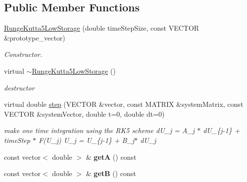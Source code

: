\subsection*{Public Member Functions}
\begin{DoxyCompactItemize}
\item 
\hyperlink{classnatrium_1_1RungeKutta5LowStorage_a1f879ee900db9ac82ddd12820e7b703d}{RungeKutta5LowStorage} (double timeStepSize, const VECTOR \&prototype\_\-vector)
\begin{DoxyCompactList}\small\item\em Constructor. \item\end{DoxyCompactList}\item 
\hypertarget{classnatrium_1_1RungeKutta5LowStorage_a915493da30cf9308bd47e87d0c20cad8}{
virtual \hyperlink{classnatrium_1_1RungeKutta5LowStorage_a915493da30cf9308bd47e87d0c20cad8}{$\sim$RungeKutta5LowStorage} ()}
\label{classnatrium_1_1RungeKutta5LowStorage_a915493da30cf9308bd47e87d0c20cad8}

\begin{DoxyCompactList}\small\item\em destructor \item\end{DoxyCompactList}\item 
\hypertarget{classnatrium_1_1RungeKutta5LowStorage_a11ed7e7ef3b4a5e575452261bc783a21}{
virtual double \hyperlink{classnatrium_1_1RungeKutta5LowStorage_a11ed7e7ef3b4a5e575452261bc783a21}{step} (VECTOR \&vector, const MATRIX \&systemMatrix, const VECTOR \&systemVector, double t=0, double dt=0)}
\label{classnatrium_1_1RungeKutta5LowStorage_a11ed7e7ef3b4a5e575452261bc783a21}

\begin{DoxyCompactList}\small\item\em make one time integration using the RK5 scheme dU\_\-j = A\_\-j $\ast$ dU\_\-\{j-\/1\} + timeStep $\ast$ F(U\_\-j) U\_\-j = U\_\-\{j-\/1\} + B\_\-j$\ast$ dU\_\-j \item\end{DoxyCompactList}\item 
\hypertarget{classnatrium_1_1RungeKutta5LowStorage_a452fad5bef3b7734c94ca5796ce0c589}{
const vector$<$ double $>$ \& {\bfseries getA} () const }
\label{classnatrium_1_1RungeKutta5LowStorage_a452fad5bef3b7734c94ca5796ce0c589}

\item 
\hypertarget{classnatrium_1_1RungeKutta5LowStorage_ac866c3f75f850ab90b70b3eaedd3cc3c}{
const vector$<$ double $>$ \& {\bfseries getB} () const }
\label{classnatrium_1_1RungeKutta5LowStorage_ac866c3f75f850ab90b70b3eaedd3cc3c}


\end{DoxyCompactItemize}
